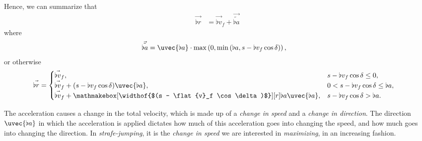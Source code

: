 Hence, we can summarize that
\begin{align}
\label{eq:r}
\vec{\flat{r}} &= \vec{\flat{v}}_f + \vec{\tilde{\flat{a}}}
\end{align}
where
\begin{align}
\label{eq:a_tilde}
\vec{\tilde{\flat{a}}} &= \uvec{\flat{a}}\cdot\max\left(0, \min\left(\flat{a}, s - \flat{v}_f \cos\delta\right)\right),
\end{align}
or otherwise
\begin{align*}
\vec{\flat{r}} &=
\begin{cases}
\vec{\flat{v}}_f, & s - \flat{v}_f \cos\delta \le 0,\\
\vec{\flat{v}}_f + (s - \flat{v}_f \cos\delta)\uvec{\flat{a}}, & 0 < s - \flat{v}_f \cos\delta \le \flat{a},\\
\vec{\flat{v}}_f + \mathmakebox[\widthof{$(s - \flat{v}_f \cos\delta)$}][r]{\flat{a}} \uvec{\flat{a}}, & s - \flat{v}_f \cos\delta > \flat{a}.
\end{cases}
\end{align*}

The acceleration causes a change in the total velocity, which is made up of a \emph{change in speed} and a \emph{change in direction}. The direction $\uvec{\flat{a}}$ in which the acceleration is applied dictates how much of this acceleration goes into changing the speed, and how much goes into changing the direction. In \emph{strafe-jumping}, it is the \emph{change in speed} we are interested in \emph{maximizing}, in an increasing fashion.

